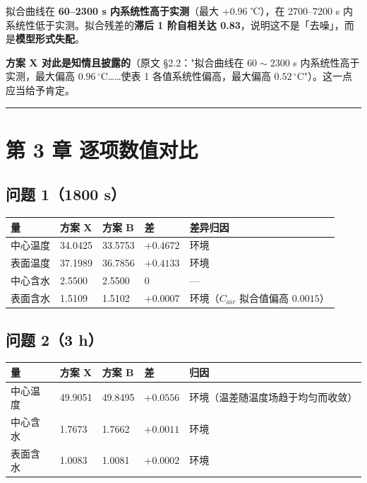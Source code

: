 拟合曲线在 \textbf{60–2300 s 内系统性高于实测}（最大 +0.96 ℃），在 2700–7200 s 内系统性低于实测。拟合残差的\textbf{滞后 1 阶自相关达 0.83}，说明这不是「去噪」，而是\textbf{模型形式失配}。


\textbf{方案 X 对此是知情且披露的}（原文 §2.2："拟合曲线在 $60\sim2300$ s 内系统性高于实测，最大偏高 $0.96\,^\circ$C……使表 1 各值系统性偏高，最大偏高 $0.52\,^\circ$C"）。这一点应当给予肯定。


\vspace{1mm}\hrule\vspace{1mm}


\section{第 3 章 逐项数值对比}


\subsection{问题 1（1800 s）}


\begin{center}
\small
\begin{tabular}{lllll}
\toprule
量 & 方案 X & 方案 B & 差 & 差异归因 \\
\midrule
中心温度 & 34.0425 & 33.5753 & $+0.4672$ & 环境 \\
表面温度 & 37.1989 & 36.7856 & $+0.4133$ & 环境 \\
中心含水 & 2.5500 & 2.5500 & $0$ & — \\
表面含水 & 1.5109 & 1.5102 & $+0.0007$ & 环境（$C_{air}$ 拟合值偏高 $0.0015$） \\
\bottomrule
\end{tabular}
\end{center}


\subsection{问题 2（3 h）}


\begin{center}
\small
\begin{tabular}{lllll}
\toprule
量 & 方案 X & 方案 B & 差 & 归因 \\
\midrule
中心温度 & 49.9051 & 49.8495 & $+0.0556$ & 环境（温差随温度场趋于均匀而收敛） \\
中心含水 & 1.7673 & 1.7662 & $+0.0011$ & 环境 \\
表面含水 & 1.0083 & 1.0081 & $+0.0002$ & 环境 \\
\bottomrule
\end{tabular}
\end{center}


